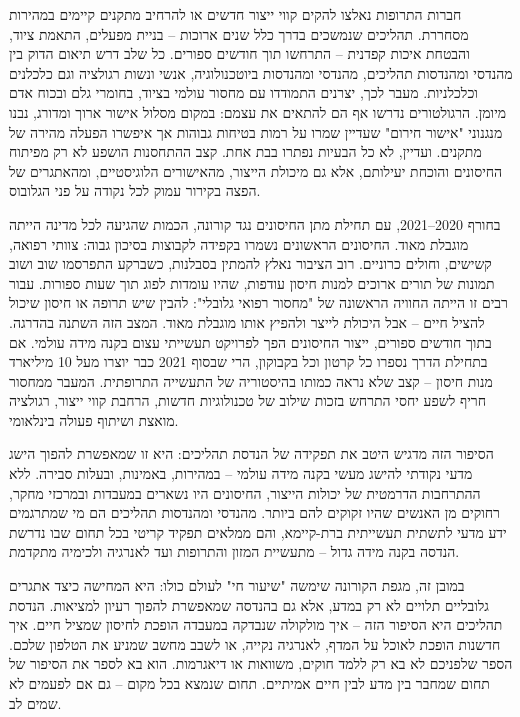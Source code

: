 \documentclass[
  hebrew,
  letterpaper,
  DIV=11,
  numbers=noendperiod]{scrreprt}
\begin{document}
{חברות התרופות נאלצו להקים קווי ייצור חדשים או להרחיב מתקנים קיימים
במהירות מסחררת. תהליכים שנמשכים בדרך כלל שנים ארוכות -- בניית מפעלים,
התאמת ציוד, והבטחת איכות קפדנית -- התרחשו תוך חודשים ספורים. כל שלב דרש
תיאום הדוק בין מהנדסי ומהנדסות תהליכים, מהנדסי ומהנדסות ביוטכנולוגיה,
אנשי ונשות רגולציה וגם כלכלנים וכלכלניות. מעבר לכך, יצרנים התמודדו עם
מחסור עולמי בציוד, בחומרי גלם ובכוח אדם מיומן}. {הרגולטורים נדרשו אף הם
להתאים את עצמם: במקום מסלול אישור ארוך ומדורג, נבנו מנגנוני "אישור
חירום" שעדיין שמרו על רמות בטיחות גבוהות אך איפשרו הפעלה מהירה של
מתקנים. ועדיין, לא כל הבעיות נפתרו בבת אחת. קצב ההתחסנות הושפע לא רק
מפיתוח החיסונים והוכחת יעילותם, אלא גם מיכולת הייצור, מהאישורים
הלוגיסטיים, ומהאתגרים של הפצה בקירור עמוק לכל נקודה על פני הגלובוס}.

{בחורף 2020--2021, עם תחילת מתן החיסונים נגד קורונה, הכמות שהגיעה לכל
מדינה הייתה מוגבלת מאוד. החיסונים הראשונים נשמרו בקפידה לקבוצות בסיכון
גבוה: צוותי רפואה, קשישים, וחולים כרוניים. רוב הציבור נאלץ להמתין
בסבלנות, כשברקע התפרסמו שוב ושוב תמונות של תורים ארוכים למנות חיסון
עודפות, שהיו עומדות לפוג תוך שעות ספורות. עבור רבים זו הייתה החוויה
הראשונה של "מחסור רפואי גלובלי": להבין שיש תרופה או חיסון שיכול להציל
חיים -- אבל היכולת לייצר ולהפיץ אותו מוגבלת מאוד}. {המצב הזה השתנה
בהדרגה. בתוך חודשים ספורים, ייצור החיסונים הפך לפרויקט תעשייתי עצום בקנה
מידה עולמי. אם בתחילת הדרך נספרו כל קרטון וכל בקבוקון, הרי שבסוף 2021
כבר יוצרו מעל 10 מיליארד מנות חיסון -- קצב שלא נראה כמותו בהיסטוריה של
התעשייה התרופתית. המעבר ממחסור חריף לשפע יחסי התרחש בזכות שילוב של
טכנולוגיות חדשות, הרחבת קווי ייצור, רגולציה מואצת ושיתוף פעולה
בינלאומי}.

{הסיפור הזה מדגיש היטב את תפקידה של הנדסת תהליכים: היא זו שמאפשרת להפוך
הישג מדעי נקודתי להישג מעשי בקנה מידה עולמי -- במהירות, באמינות, ובעלות
סבירה. ללא ההתרחבות הדרמטית של יכולות הייצור, החיסונים היו נשארים
במעבדות ובמרכזי מחקר, רחוקים מן האנשים שהיו זקוקים להם ביותר}. {מהנדסי
ומהנדסות תהליכים הם מי שמתרגמים ידע מדעי לתשתית תעשייתית ברת-קיימא, והם
ממלאים תפקיד קריטי בכל תחום שבו נדרשת הנדסה בקנה מידה גדול -- מתעשיית
המזון והתרופות ועד לאנרגיה ולכימיה מתקדמת}.

{במובן זה, מגפת הקורונה שימשה "שיעור חי" לעולם כולו: היא המחישה כיצד
אתגרים גלובליים תלויים לא רק במדע, אלא גם בהנדסה שמאפשרת להפוך רעיון
למציאות}. {הנדסת תהליכים היא הסיפור הזה -- איך מולקולה שנבדקה במעבדה
הופכת לחיסון שמציל חיים. איך חדשנות הופכת לאוכל על המדף, לאנרגיה נקייה,
או לשבב מחשב שמניע את הטלפון שלכם}. {הספר שלפניכם לא בא רק ללמד חוקים,
משוואות או דיאגרמות. הוא בא לספר את הסיפור של תחום שמחבר בין מדע לבין
חיים אמיתיים. תחום שנמצא בכל מקום -- גם אם לפעמים לא שמים לב.}
\end{document}
